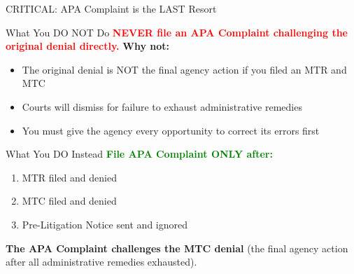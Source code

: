 \documentclass[11pt]{beamer}
\begin{document}
	\begin{frame}{CRITICAL: APA Complaint is the LAST Resort}
		\scriptsize
		\begin{block}{What You DO NOT Do}
			\textcolor{red}{\textbf{NEVER file an APA Complaint challenging the original denial directly.}}
			\vspace{0.2cm}
			\textbf{Why not:}
			\begin{itemize}
				\item The original denial is NOT the final agency action if you filed an MTR and MTC
				\item Courts will dismiss for failure to exhaust administrative remedies
				\item You must give the agency every opportunity to correct its errors first
			\end{itemize}
		\end{block}
		\begin{block}{What You DO Instead}
			\textcolor{green}{\textbf{File APA Complaint ONLY after:}}
			\begin{enumerate}
				\item MTR filed and denied
				\item MTC filed and denied
				\item Pre-Litigation Notice sent and ignored
			\end{enumerate}
			\textbf{The APA Complaint challenges the MTC denial} (the final agency action after all administrative remedies exhausted).
		\end{block}
	\end{frame}
	
\end{document}
